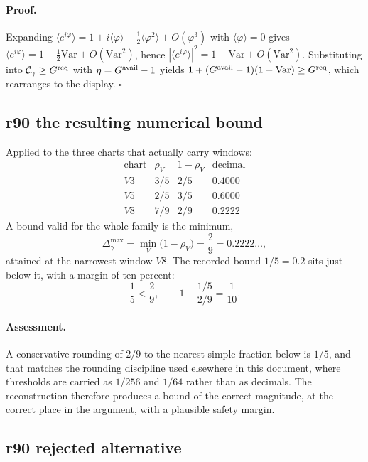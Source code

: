 \paragraph{Proof.}
Expanding \(\langle e^{i\varphi}\rangle=1+i\langle\varphi\rangle-\tfrac12\langle\varphi^2\rangle
+O(\varphi^3)\) with \(\langle\varphi\rangle=0\) gives
\(\langle e^{i\varphi}\rangle=1-\tfrac12\mathrm{Var}+O(\mathrm{Var}^2)\), hence
\(|\langle e^{i\varphi}\rangle|^2=1-\mathrm{Var}+O(\mathrm{Var}^2)\).  Substituting into
\(\mathcal C_\gamma\ge G^{\rm req}\) with \(\eta=G^{\rm avail}-1\) yields
\(1+(G^{\rm avail}-1)(1-\mathrm{Var})\ge G^{\rm req}\), which rearranges to the display.
\(\square\)

\subsection*{r90 the resulting numerical bound}
\label{subsec:r90-numerical-bound}

Applied to the three charts that actually carry windows:
\[
\begin{array}{c|c|c|c}
\text{chart} & \rho_V & 1-\rho_V & \text{decimal}\\
\hline
V3 & 3/5 & 2/5 & 0.4000\\
V5 & 2/5 & 3/5 & 0.6000\\
V8 & 7/9 & 2/9 & 0.2222
\end{array}
\]
A bound valid for the whole family is the minimum,
\[
\Delta_\gamma^{\max}=\min_V\bigl(1-\rho_V\bigr)=\frac29=0.2222\ldots,
\]
attained at the narrowest window \(V8\).  The recorded bound \(1/5=0.2\) sits just below it,
with a margin of ten percent:
\[
\frac15<\frac29,
\qquad
1-\frac{1/5}{2/9}=\frac1{10}.
\]

\paragraph{Assessment.}
A conservative rounding of \(2/9\) to the nearest simple fraction below is \(1/5\), and that
matches the rounding discipline used elsewhere in this document, where thresholds are carried
as \(1/256\) and \(1/64\) rather than as decimals.  The reconstruction therefore produces a
bound of the correct magnitude, at the correct place in the argument, with a plausible safety
margin.

\subsection*{r90 rejected alternative}
\label{subsec:r90-rejected-alternative}

